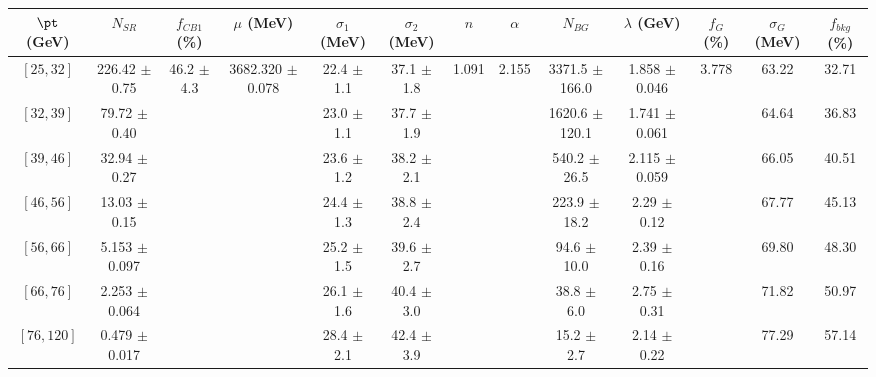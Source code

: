 \begin{tabular}{c||c|c|c|c|c|c|c|c|c|c|c||c}
$\pt$ (GeV) & $N_{SR}$ & $f_{CB1}$ (\%) & $\mu$ (MeV) & $\sigma_1$ (MeV) & $\sigma_2$ (MeV) & $n$ & $\alpha$ & $N_{BG}$ & $\lambda$ (GeV) & $f_G$ (\%) & $\sigma_G$ (MeV) & $f_{bkg}$ (\%) \\
\hline
$[25, 32]$ & 226.42 $\pm$ 0.75 & \multirow{7}{*}{46.2 $\pm$ 4.3} & \multirow{7}{*}{3682.320 $\pm$ 0.078} & 22.4 $\pm$ 1.1 & 37.1 $\pm$ 1.8 & \multirow{7}{*}{1.091} & \multirow{7}{*}{2.155} & 3371.5 $\pm$ 166.0 & 1.858 $\pm$ 0.046 & \multirow{7}{*}{3.778} & 63.22 & 32.71\\
$[32, 39]$ & 79.72 $\pm$ 0.40 &  &  & 23.0 $\pm$ 1.1 & 37.7 $\pm$ 1.9 &  &  & 1620.6 $\pm$ 120.1 & 1.741 $\pm$ 0.061 &  & 64.64 & 36.83\\
$[39, 46]$ & 32.94 $\pm$ 0.27 &  &  & 23.6 $\pm$ 1.2 & 38.2 $\pm$ 2.1 &  &  & 540.2 $\pm$ 26.5 & 2.115 $\pm$ 0.059 &  & 66.05 & 40.51\\
$[46, 56]$ & 13.03 $\pm$ 0.15 &  &  & 24.4 $\pm$ 1.3 & 38.8 $\pm$ 2.4 &  &  & 223.9 $\pm$ 18.2 & 2.29 $\pm$ 0.12 &  & 67.77 & 45.13\\
$[56, 66]$ & 5.153 $\pm$ 0.097 &  &  & 25.2 $\pm$ 1.5 & 39.6 $\pm$ 2.7 &  &  & 94.6 $\pm$ 10.0 & 2.39 $\pm$ 0.16 &  & 69.80 & 48.30\\
$[66, 76]$ & 2.253 $\pm$ 0.064 &  &  & 26.1 $\pm$ 1.6 & 40.4 $\pm$ 3.0 &  &  & 38.8 $\pm$ 6.0 & 2.75 $\pm$ 0.31 &  & 71.82 & 50.97\\
$[76, 120]$ & 0.479 $\pm$ 0.017 &  &  & 28.4 $\pm$ 2.1 & 42.4 $\pm$ 3.9 &  &  & 15.2 $\pm$ 2.7 & 2.14 $\pm$ 0.22 &  & 77.29 & 57.14\\
\end{tabular}
